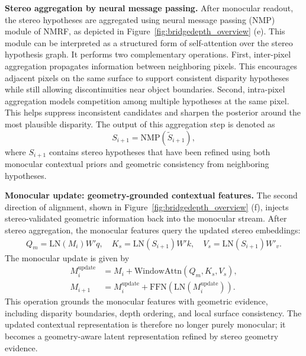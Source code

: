 \noindent\textbf{Stereo aggregation by neural message passing.} After monocular readout, the stereo hypotheses are aggregated using neural message passing (NMP) module of NMRF, as depicted in Figure~\ref{fig:bridgedepth_overview} (e).
This module can be interpreted as a structured form of self-attention over the stereo hypothesis graph.
It performs two complementary operations.
First, inter-pixel aggregation propagates information between neighboring pixels.
This encourages adjacent pixels on the same surface to support consistent disparity hypotheses while still allowing discontinuities near object boundaries.
Second, intra-pixel aggregation models competition among multiple hypotheses at the same pixel.
This helps suppress inconsistent candidates and sharpen the posterior around the most plausible disparity.
The output of this aggregation step is denoted as
\begin{equation} S_{i+1} = \mathrm{NMP}\left(\widetilde{S}_{i+1}\right), \end{equation}
where $S_{i+1}$ contains stereo hypotheses that have been refined using both monocular contextual priors and geometric consistency from neighboring hypotheses.

\noindent\textbf{Monocular update: geometry-grounded contextual features.}
The second direction of alignment, shown in Figure~\ref{fig:bridgedepth_overview} (f), injects stereo-validated geometric information back into the monocular stream.
After stereo aggregation, the monocular features query the updated stereo embeddings:
\begin{equation} \begin{aligned} Q_m = \mathrm{LN}(M_i) W'q, \quad K_s = \mathrm{LN}(S_{i+1}) W'k, \quad V_s = \mathrm{LN}(S_{i+1}) W'_v. \end{aligned} \end{equation}
The monocular update is given by
\begin{align} 
	M_i^{\mathrm{update}} &= M_i + \mathrm{WindowAttn}(Q_m, K_s, V_s), \\
	 M_{i+1} &= M_i^{\mathrm{update}} + \mathrm{FFN}\left(\mathrm{LN}(M_i^{\mathrm{update}})\right).
	\label{eq:bridge_update} 
\end{align}
This operation grounds the monocular features with geometric evidence, including disparity boundaries, depth ordering, and local surface consistency.
The updated contextual representation is therefore no longer purely monocular; it becomes a geometry-aware latent representation refined by stereo geometry evidence.

